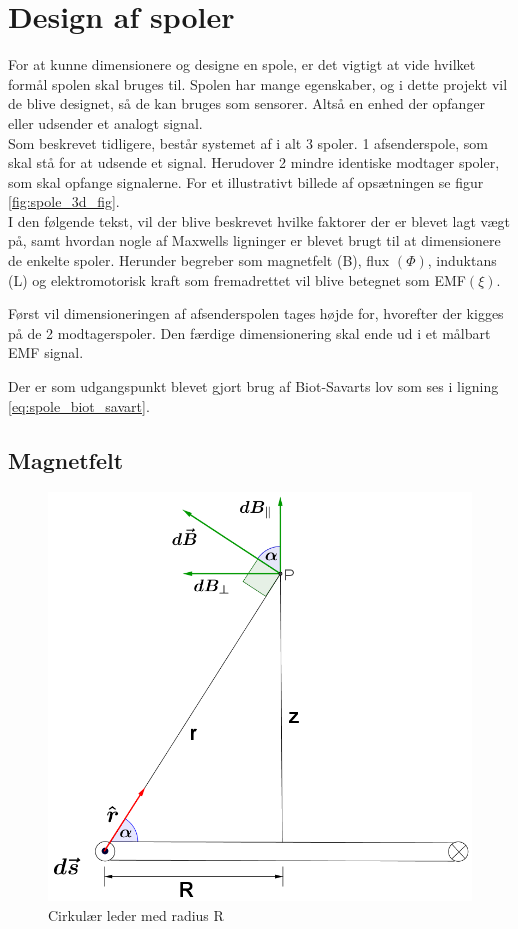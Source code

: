 \section{Design af spoler}\label{sec:sec_spole_design}
For at kunne dimensionere og designe en spole, er det vigtigt at vide hvilket formål spolen skal bruges til. Spolen har mange egenskaber, og i dette projekt vil de blive designet, så de kan bruges som sensorer. Altså en enhed der opfanger eller udsender et analogt signal. \\
Som beskrevet tidligere, består systemet af i alt 3 spoler. 1 afsenderspole, som skal stå for at udsende et signal. Herudover 2 mindre identiske modtager spoler, som skal opfange signalerne. For et illustrativt billede af opsætningen se figur \ref{fig:spole_3d_fig}.\\
I den følgende tekst, vil der blive beskrevet hvilke faktorer der er blevet lagt vægt på, samt hvordan nogle af Maxwells ligninger er blevet brugt til at dimensionere de enkelte spoler. Herunder begreber som magnetfelt (B), flux $(\Phi)$, induktans (L) og elektromotorisk kraft som fremadrettet vil blive betegnet som EMF$(\xi)$. 

Først vil dimensioneringen af afsenderspolen tages højde for, hvorefter der kigges på de 2 modtagerspoler.
Den færdige dimensionering skal ende ud i et målbart EMF signal.

Der er som udgangspunkt blevet gjort brug af Biot-Savarts lov som ses i ligning \ref{eq:spole_biot_savart}.
\subsection{Magnetfelt}
\begin{figure}[h!]
	\centering
	\includegraphics[width=.6\textwidth]{billeder/B_felt.png}
	\caption{Cirkulær leder med radius R}
	\label{fig:spole_fig1}
\end{figure}

